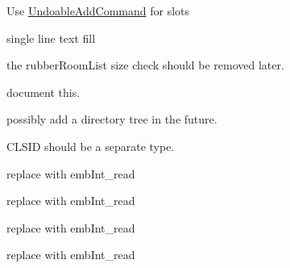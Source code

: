 \begin{DoxyRefList}
\label{todo__todo000148}%
%
Use \mbox{\hyperlink{class_undoable_add_command}{Undoable\+Add\+Command}} for slots 
\item[Member \mbox{\hyperlink{imgui__main_8c_a551fa26c5cb41765c5da55164b8d74d1}{add\+\_\+text\+\_\+single}} (const char $\ast$str, Emb\+Real x, Emb\+Real y, Emb\+Real rot, bool fill, int rubber\+Mode)]\label{todo__todo000188}%
%
single line text fill  
\item[Member \mbox{\hyperlink{imgui__main_8c_ae7e67339f8e559559f7b1940ed36e1b6}{allow\+\_\+rubber}} (void)]\label{todo__todo000041}%
%
the rubber\+Room\+List size check should be removed later.  
\item[Member \mbox{\hyperlink{imgui__main_8c_a6a745fd92d172c4c2b1713493871e4de}{background\+\_\+color\+\_\+action}} (void)]\label{todo__todo000126}%
%
document this.  
\item[Member \mbox{\hyperlink{embroidery__internal_8h_a5e0de54ec0ef10b88a4e499bbe94f869}{bcf\+\_\+directory}} ]\label{todo__todo000392}%
%
possibly add a directory tree in the future.  
\item[Member \mbox{\hyperlink{embroidery__internal_8h_a5226ee18f1045aa203f53da9b74d6963}{bcf\+\_\+file\+\_\+header}} ]\label{todo__todo000393}%
%
CLSID should be a separate type.  
\item[Member \mbox{\hyperlink{formats_8c_acaa069d2e820245be0f711415e2c297d}{binary\+Write\+Int}} (FILE $\ast$f, int data)]\label{todo__todo000408}%
%
replace with emb\+Int\+\_\+read  
\item[Member \mbox{\hyperlink{formats_8c_ad608ccee7fa2036aeba8500061ea0824}{binary\+Write\+Int\+BE}} (FILE $\ast$f, int data)]\label{todo__todo000409}%
%
replace with emb\+Int\+\_\+read  
\item[Member \mbox{\hyperlink{formats_8c_ab2256826c6ea8d2374fc94df46a7616f}{binary\+Write\+Short}} (FILE $\ast$f, short data)]\label{todo__todo000405}%
%
replace with emb\+Int\+\_\+read  
\item[Member \mbox{\hyperlink{formats_8c_ad56027171faded451118350359c1e8ae}{binary\+Write\+UInt}} (FILE $\ast$f, unsigned int data)]\label{todo__todo000410}%
%
replace with emb\+Int\+\_\+read  
\item[Member \mbox{\hyperlink{formats_8c_a152fc4262fce475f30786312da68fad6}{binary\+Write\+UInt\+BE}} (FILE $\ast$f, unsigned int data)]\label{todo__todo000411}%

\end{DoxyRefList}
